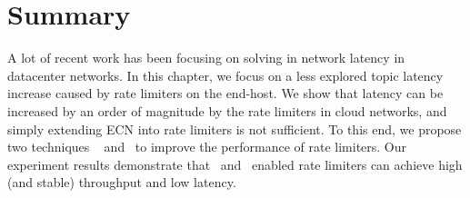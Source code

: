 \section{Summary} 
\label{rate-limiter:sec:conclusion} 

A lot of recent work has been focusing on solving in network latency in datacenter networks.
In this chapter, we focus on a less explored topic \textemdash\xspace latency
increase caused by rate limiters on the end-host.
We show that latency can be increased by an order of magnitude
by the rate limiters in cloud networks,
and simply extending ECN into rate limiters is not sufficient.
To this end, we propose two techniques \textemdash\xspace~\dem{} and~\spring{} to improve the performance of rate limiters.
Our experiment results demonstrate that~\dem{} and~\spring{} enabled
rate limiters can achieve high (and stable) throughput and low latency.
